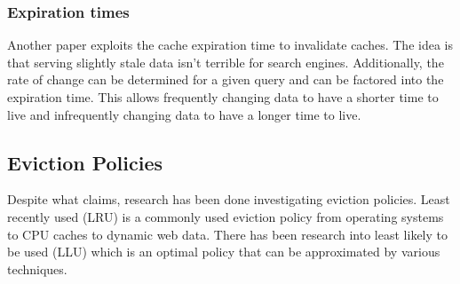 \documentclass[12pt]{article}
\begin{document}
\subsubsection{Expiration times}
Another paper exploits the cache expiration time to invalidate caches.\cite{refreshingPerspectiveSearch}
The idea is that serving slightly stale data isn't terrible for search engines.
Additionally, the rate of change can be determined for a given query and can be factored into the expiration time.
This allows frequently changing data to have a shorter time to live and infrequently changing data to have a longer time to live.

\subsection{Eviction Policies}
Despite what \cite{refreshingPerspectiveSearch} claims, research has been done investigating eviction policies.
Least recently used (LRU) is a commonly used eviction policy from operating systems to CPU caches to dynamic web data.
There has been research into least likely to be used (LLU) which is an optimal policy that can be approximated by various techniques.




\end{document}
